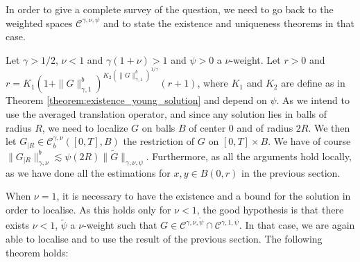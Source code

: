 \documentclass[a4paper,11pt]{article}
\newcommand{\CC}{\mathscr C}
\begin{document}
In order to give a complete survey of the question, we need to go back to the
weighted spaces $\CC^{\gamma , \nu , \psi}$ and to state the  existence and uniqueness
theorems in that case.

Let $\gamma >1/2$, $\nu <1$ and $\gamma ( 1+ \nu ) >1$ and $\psi >0$ a
$\nu$-weight. Let $r>0$ and $r=K_{1} ( 1+ \| G \|_{\gamma ,1}^{b} )^{K_{2} (
\| G \|^{b}_{\gamma ,1} )^{1/ \gamma}} ( r+1 )$, where $K_{1}$ and $K_{2}$ are
define as in Theorem \ref{theorem:existence_young_solution} and depend on
$\psi$. As we intend to use the averaged translation operator, and since any
solution lies in balls of radius $R$, we need to localize $G$ on balls $B$ of
center $0$ and of radius $2R$. We then let $G_{|R} \in \CC^{\gamma , \nu}_{ b}
( [ 0,T ] ,B )$ the restriction of $G$ on $[ 0,T ] \times B$. We have of
course $\| G_{|R} \|^{b}_{\gamma , \nu} \lesssim \psi ( 2R ) \| \tilde{G}
\|_{\gamma , \nu , \psi}$. Furthermore, as all the arguments hold locally, as
we have done all the estimations for $x,y \in B ( 0,r )$ in the previous section.

When $\nu =1$, it is necessary to have the existence and a bound for the
solution in order to localise. As this holds only for $\nu <1$, the good
hypothesis is that there exists $\nu <1$, $\tilde{\psi}$ a $\nu$-weight such
that $G \in \CC^{\gamma , \nu , \tilde{\psi}} \cap \CC^{\gamma ,1, \psi}$. In
that case, we are again able to localise and to use the result of the
previous section. The following theorem holds:
\end{document}
